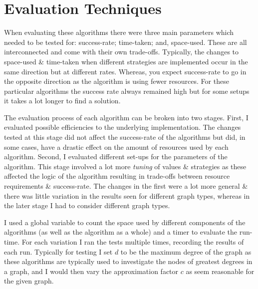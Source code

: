 \documentclass[11pt,twoside,a4paper]{report}
\begin{document}
\section{Evaluation Techniques}



When evaluating these algorithms there were three main parameters which needed to be tested for: success-rate; time-taken; and, space-used. These are all interconnected and come with their own trade-offs. Typically, the changes to space-used \& time-taken when different strategies are implemented occur in the same direction but at different rates. Whereas, you expect success-rate to go in the opposite direction as the algorithm is using fewer resources.
For these particular algorithms the success rate always remained high but for some setups it takes a lot longer to find a solution. %
\par The evaluation process of each algorithm can be broken into two stages. First, I evaluated possible efficiencies to the underlying implementation. The changes tested at this stage did not affect the success-rate of the algorithms but did, in some cases, have a drastic effect on the amount of resources used by each algorithm. Second, I evaluated different set-ups for the parameters of the algorithm. This stage involved a lot more \textit{tuning} of values \& strategies as these affected the logic of the algorithm resulting in trade-offs between resource requirements \& success-rate. The changes in the first were a lot more general \& there was little variation in the results seen for different graph types, whereas in the later stage I had to consider different graph types.
\par I used a global variable to count the space used by different components of the algorithms (as well as the algorithm as a whole) and a timer to evaluate the run-time. For each variation I ran the tests multiple times, recording the results of each run. Typically for testing I set $d$ to be the maximum degree of the graph as these algorithms are typically used to investigate the nodes of greatest degrees in a graph, and I would then vary the approximation factor $c$ as seem reasonable for the given graph.
\end{document}
